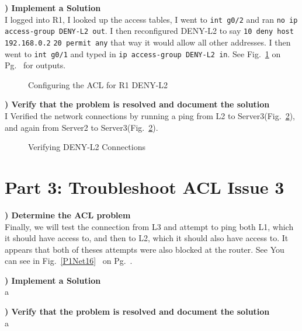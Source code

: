 \documentclass{report}
\newcommand{\mysection}[1]{\section*{#1}}
\newcommand{\mysubsection}[2]{\textbf{\romannumeral #1) #2}}
\begin{document}
\noindent\mysubsection{2}{Implement a Solution}\\
I logged into R1, I looked up the access tables, I went to
{\scriptsize{\verb$int g0/2$}\normalsize} and ran
{\scriptsize{\verb$no ip access-group DENY-L2 out$}\normalsize}. I then
reconfigured DENY-L2 to say 
{\scriptsize{\verb$10 deny host 192.168.0.2$}\normalsize} 
{\scriptsize{\verb$20 permit any$}\normalsize} that way it would 
allow all other addresses.  I then went to 
{\scriptsize{\verb$int g0/1$}\normalsize} and typed
in {\scriptsize{\verb$ip access-group DENY-L2 in$}\normalsize}. See
Fig.~\ref{P2Config16} on Pg.~\pageref{P2Config16} for outputs.


\begin{figure}[!hbt]\centering
{}\hfill
{}\par 
{}
\caption{Configuring the ACL for R1 DENY-L2}\label{P2Config16}
\end{figure}


\noindent\mysubsection{3}{Verify that the problem is resolved and document the
solution}\\
I Verified the network connections by running a ping from L2 to
Server3(Fig.~\ref{P2Verify16}), and
again from Server2 to Server3(Fig.~\ref{P2Verify16}).


\begin{figure}[!hbt]\centering
{}\hfill
{}\par 
\caption{Verifying DENY-L2 Connections}\label{P2Verify16}
\end{figure}


\clearpage


\mysection{\textbf{Part 3: Troubleshoot ACL Issue 3}}


\mysubsection{1}{Determine the ACL problem}\\
Finally, we will test the connection from L3 and attempt to ping both L1, which
it should have access to, and then to L2, which it should also have access to.
It appears that both of theses attempts were also blocked at the router. See
You can see in Fig.~\ref{P1Net16}~ 
on Pg.~\pageref{P1Net16}.



\noindent\mysubsection{2}{Implement a Solution}\\
a

\noindent\mysubsection{3}{Verify that the problem is resolved and document the
solution}\\
a


\end{document}

